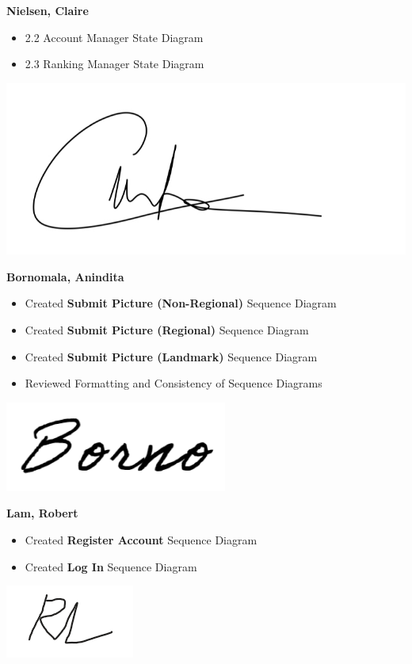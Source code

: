 \documentclass[]{article}
\begin{document}
\textbf{Nielsen, Claire}
\begin{itemize}
    \item 2.2 Account Manager State Diagram
    \item 2.3 Ranking Manager State Diagram
\end{itemize}
\includegraphics[scale=0.15]{clairesignature.jpg}

\textbf{Bornomala, Anindita}
\begin{itemize}
    \item Created \textbf{Submit Picture (Non-Regional)} Sequence Diagram
    \item Created \textbf{Submit Picture (Regional)} Sequence Diagram
    \item Created \textbf{Submit Picture (Landmark)} Sequence Diagram
    \item Reviewed Formatting and Consistency of Sequence Diagrams
\end{itemize}
\includegraphics[scale=0.50]{bornosignature.png}

\textbf{Lam, Robert}
\begin{itemize}
    \item Created \textbf{Register Account} Sequence Diagram
    \item Created \textbf{Log In} Sequence Diagram
\end{itemize}
\includegraphics[scale=1]{robertsignature.png}

\end{document}
